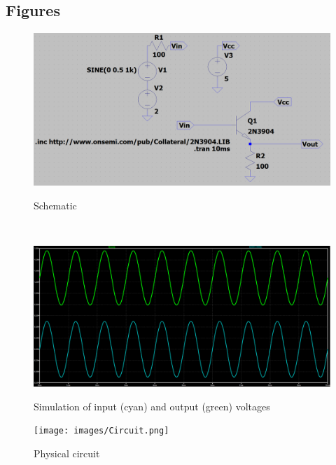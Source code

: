 \documentclass[12pt]{article}
\begin{document}
\pagebreak
\begin{landscape}
  \pagestyle{lscapedplain}
  \appendix
  \section{Figures}
  \begin{figure}[ht!]
    \begin{minipage}[b]{0.5\linewidth}
        \centering
        \includegraphics[width=0.9\linewidth]{images/Schematic.png} 
        \caption{Schematic}
        \label{fig:Schematic}
        \vspace{4ex}
    \end{minipage}%
    ~
    \begin{minipage}[b]{0.5\linewidth}
        \centering
        \includegraphics[width=\linewidth]{images/Simulation.png} 
        \caption{Simulation of input (cyan) and output (green) voltages}
        \label{fig:Simulation}
        \vspace{4ex}
    \end{minipage}
    \begin{minipage}[b]{0.5\linewidth}
        \centering
        \texttt{[image: images/Circuit.png]} 
        \caption{Physical circuit} 
    \end{minipage}%
    \begin{minipage}[b]{0.5\linewidth}

\end{minipage}
\end{figure}
\end{landscape}
\end{document}
